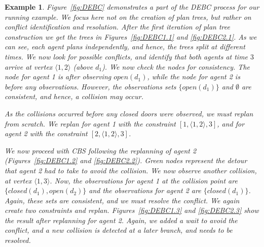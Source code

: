 \documentclass[letterpaper]{article} %
\newtheorem{exmp}{Example}
\begin{document}
\begin{exmp}
Figure~\ref{fig:DEBC} demonstrates a part of the DEBC process for our running example. We focus here not on the creation of plan trees, but rather on conflict identification and resolution. After the first iteration of plan tree construction we get the trees in Figures~\ref{fig:DEBC1.1} and \ref{fig:DEBC2.1}. As we can see, each agent plans independently, and hence, the trees split at different times. We now look for possible conflicts, and identify that both agents at time $3$ arrive at vertex $\langle 1, 2 \rangle$ (above $d_1$). We now check the nodes for consistency. The node for agent 1 is after observing $open(d_1)$, while the node for agent 2 is before any observations. However, the observations sets $\{open(d_1)\}$ and $\emptyset$ are consistent, and hence, a collision may occur.

As the collisions occurred before any closed doors were observed, we must replan from scratch. We replan for agent 1 with the constraint $[ 1, \langle 1, 2 \rangle, 3 ] $, and for agent 2 with the constraint $[ 2, \langle 1, 2 \rangle, 3 ] $. 

We now proceed with CBS following the replanning of agent 2 (Figures~\ref{fig:DEBC1.2} and \ref{fig:DEBC2.2}). Green nodes represent the detour that agent 2 had to take to avoid the collision. We now observe another collision, at vertex $\langle 1,3 \rangle $. Now, the observations for agent 1 at the collision point are $\{closed(d_1),open(d_2)\}$ and the observations for agent 2 are $\{closed(d_1)\}$. Again, these sets are consistent, and we must resolve the conflict. We again create two constraints and replan.
Figures~\ref{fig:DEBC1.3} and \ref{fig:DEBC2.3} show the result after replanning for agent 2. Again, we added a wait to avoid the conflict, and a new collision is detected at a later branch, and needs to be resolved.

\end{exmp}




\end{document}
